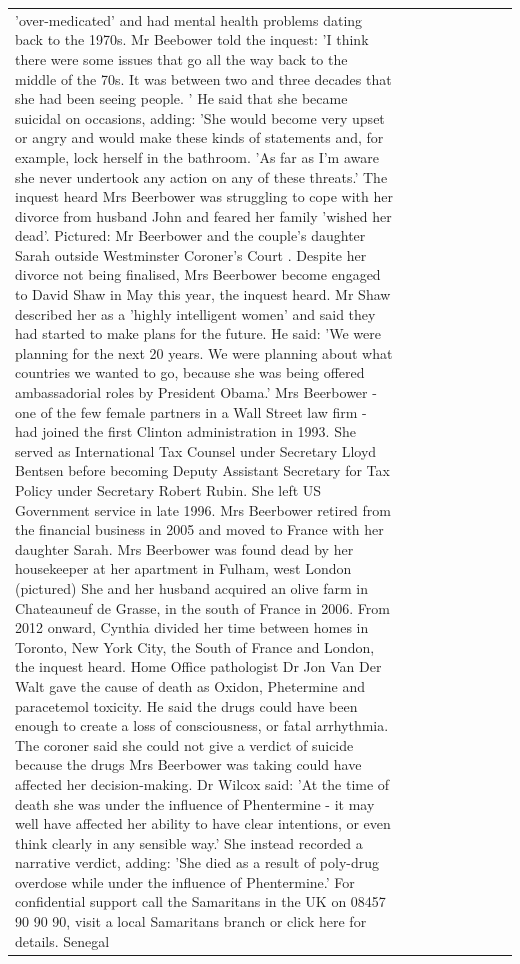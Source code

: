 \begin{table}[H]
\begin{tabular}{lllrlllll}
'over-medicated' and had mental health problems dating back to the 1970s. Mr Beebower told the inquest: 'I think there were some issues that go all the way back to the middle of the 70s. It was between two and three decades that she had been seeing people. ' He said that she became suicidal on occasions, adding: 'She would become very upset or angry and would make these kinds of statements and, for example, lock herself in the bathroom. 'As far as I'm aware she never undertook any action on any of these threats.' The inquest heard Mrs Beerbower was struggling to cope with her divorce from husband John and feared her family 'wished her dead'. Pictured: Mr Beerbower and the couple's daughter Sarah outside Westminster Coroner's Court . Despite her divorce not being finalised, Mrs Beerbower become engaged to David Shaw in May this year, the inquest heard. Mr Shaw described her as a 'highly intelligent women' and said they had started to make plans for the future. He said: 'We were planning for the next 20 years. We were planning about what countries we wanted to go, because she was being offered ambassadorial roles by President Obama.' Mrs Beerbower - one of the few female partners in a Wall Street law firm - had joined the first Clinton administration in 1993. She served as International Tax Counsel under Secretary Lloyd Bentsen before becoming Deputy Assistant Secretary for Tax Policy under Secretary Robert Rubin. She left US Government service in late 1996. Mrs Beerbower retired from the financial business in 2005 and moved to France with her daughter Sarah. Mrs Beerbower was found dead by her housekeeper at her apartment in Fulham, west London (pictured) She and her husband acquired an olive farm in Chateauneuf de Grasse, in the south of France in 2006. From 2012 onward, Cynthia divided her time between homes in Toronto, New York City, the South of France and London, the inquest heard. Home Office pathologist Dr Jon Van Der Walt gave the cause of death as Oxidon, Phetermine and paracetemol toxicity. He said the drugs could have been enough to create a loss of consciousness, or fatal arrhythmia. The coroner said she could not give a verdict of suicide because the drugs Mrs Beerbower was taking could have affected her decision-making. Dr Wilcox said: 'At the time of death she was under the influence of Phentermine - it may well have affected her ability to have clear intentions, or even think clearly in any sensible way.' She instead recorded a narrative verdict, adding: 'She died as a result of poly-drug overdose while under the influence of Phentermine.' For confidential support call the Samaritans in the UK on 08457 90 90 90, visit a local Samaritans branch or click here for details. Senegal \\

\end{tabular}
\end{table}
